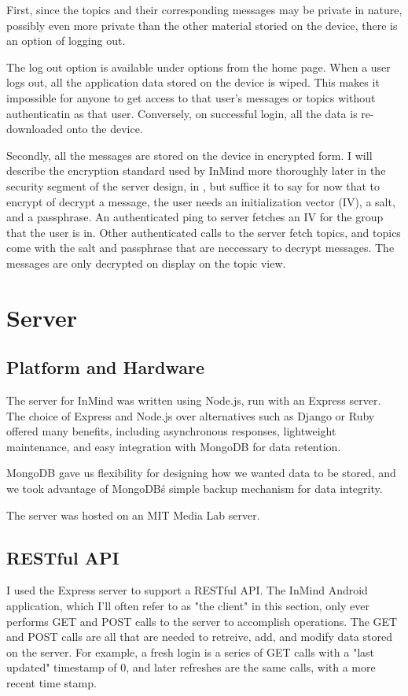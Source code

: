       First, since the topics and their corresponding messages may be private in nature,
      possibly even more private than the other material storied on the device,
      there is an option of logging out.

      The log out option is available under options from the home page.
      When a user logs out, all the application data stored on the device is wiped.
      This makes it impossible for anyone to get access to that user's
      messages or topics without authenticatin as that user.
      Conversely, on successful login, all the data is re-downloaded onto the device.

      Secondly, all the messages are stored on the device in encrypted form.
      I will describe the encryption standard used by InMind more thoroughly
      later in the security segment of the server design, in \cite{},
      but suffice it to say for now that to encrypt of decrypt a message, 
      the user needs an initialization vector (IV),
      a salt, and a passphrase.
      An authenticated ping to server fetches an IV for the group that the user is in.
      Other authenticated calls to the server fetch topics,
      and topics come with the salt and passphrase that are neccessary to decrypt messages.
      The messages are only decrypted on display on the topic view.

  \section{Server}
    \subsection{Platform and Hardware}
      The server for InMind was written using Node.js, run with an Express server.
      The choice of Express and Node.js over alternatives such as Django or Ruby
      offered many benefits, including asynchronous responses,
      lightweight maintenance, and easy integration with MongoDB for data retention.

      MongoDB gave us flexibility for designing how we wanted data to be stored,
      and we took advantage of MongoDB\'s simple backup mechanism for data integrity.

      The server was hosted on an MIT Media Lab server.

    \subsection{RESTful API}
      I used the Express server to support a RESTful API.
      The InMind Android application,
      which I'll often refer to as "the client" in this section,
      only ever performs GET and POST calls to the server to accomplish operations.
      The GET and POST calls are all that are needed to
      retreive, add, and modify data stored on the server.
      For example, a fresh login is a series of GET calls with a "last updated" timestamp
      of 0, and later refreshes are the same calls, with a more recent time stamp.

